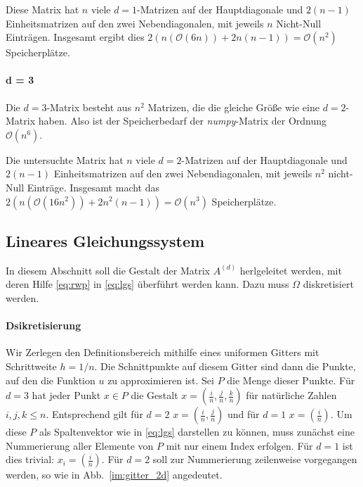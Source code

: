 \documentclass[smallheadings]{scrartcl}
\begin{document}
 Diese Matrix hat $n$ viele $d=1$-Matrizen auf der Hauptdiagonale  und $2(n-1)$ Einheitsmatrizen auf den zwei Nebendiagonalen, mit jeweils $n$ Nicht-Null Einträgen. Insgesamt ergibt dies $2(n(\mathcal{O}(6n))+2n(n-1))=\mathcal{O}(n^2)$ Speicherplätze.
 
 \paragraph{d = 3}
 Die $d=3$-Matrix besteht aus $n^2$ Matrizen, die die gleiche Größe wie eine $d=2$-Matrix haben. Also ist der Speicherbedarf der \textit{numpy}-Matrix der Ordnung $\mathcal{O}(n^6)$.
 
 Die untersuchte Matrix hat $n$ viele $d=2$-Matrizen auf der Hauptdiagonale  und $2(n-1)$ Einheitsmatrizen auf den zwei Nebendiagonalen, mit jeweils $n^2$ nicht-Null Einträge. Insgesamt macht das $2(n(\mathcal{O}(16n^2))+2n^2(n-1))=\mathcal{O}(n^3)$ Speicherplätze.


\subsection{Lineares Gleichungssystem}

In diesem Abschnitt soll die Gestalt der Matrix $A^{(d)}$ herlgeleitet werden, mit deren Hilfe \eqref{eq:rwp} in \eqref{eq:lgs} überführt werden kann. Dazu muss $\Omega$ diskretisiert werden.


\paragraph{ Dsikretisierung}

Wir Zerlegen den Definitionsbereich mithilfe eines uniformen Gitters mit Schrittweite $h = 1/n$. Die Schnittpunkte auf diesem Gitter sind dann die Punkte, auf den die Funktion $u$ zu approximieren ist. Sei $P$ die Menge dieser Punkte. Für $d=3$ hat jeder Punkt $x\in P$ die Gestalt $x = (\frac{i}{n}, \frac{j}{n}, \frac{k}{n})$ für natürliche Zahlen $i, j, k \leq n$. Entsprechend gilt für $d=2$ $x=(\frac{i}{n}, \frac{j}{n})$ und für $d=1$ $x=(\frac{i}{n})$.
Um diese $P$ als Spaltenvektor wie in \eqref{eq:lgs} darstellen zu können, muss zunächst eine Nummerierung aller Elemente von $P$ mit nur einem Index erfolgen. Für $d=1$ ist dies trivial: $x_i = (\frac{i}{n})$. 
Für $d=2$ soll zur Nummerierung zeilenweise vorgegangen werden, so wie in Abb.~\ref{im:gitter_2d} angedeutet.
\end{document}
